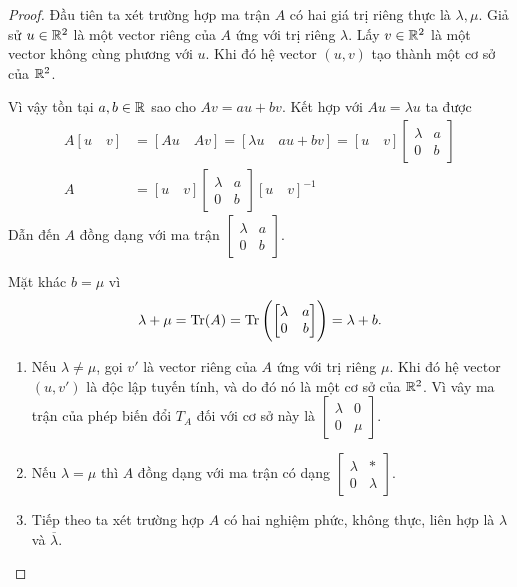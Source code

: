 \begin{proof}
    Đầu tiên ta xét trường hợp ma trận $A$ có hai giá trị riêng thực là $\lambda, \mu$. Giả sử $u \in \mathbb{R}^2$ là một vector riêng của $A$ ứng với trị riêng $\lambda$. Lấy $v \in \mathbb{R}^2$ là một vector không cùng phương với $u$. Khi đó hệ vector $(u,v)$ tạo thành một cơ sở của $\mathbb{R}^2$. 
    
    Vì vậy tồn tại $a,b \in \mathbb{R}$ sao cho $Av = au+bv$. Kết hợp với $Au = \lambda u$ ta được
    \begin{align*}
       A[u\quad v] &= [Au\quad Av]
       = [\lambda u \quad au+bv]
       = [u\quad v]\begin{bmatrix}
        \lambda &  a\\
        0 & b
    \end{bmatrix}\\
    A &= [u\quad v]\begin{bmatrix}
        \lambda &  a\\
        0 & b
    \end{bmatrix}[u \quad v]^{-1}
    \end{align*}
    Dẫn đến $A$ đồng dạng với ma trận $\begin{bmatrix}
        \lambda &  a\\
        0 & b
    \end{bmatrix}$. 
    
    Mặt khác $b = \mu$ vì
    \[\lambda + \mu = \operatorname{Tr}(A) = \operatorname{Tr}\left(\begin{bmatrix}
        \lambda &  a\\
        0 & b
    \end{bmatrix}\right) = \lambda + b.\]
    
    \begin{enumerate}
        \item Nếu $\lambda \neq \mu$, gọi $v'$ là vector riêng của $A$ ứng với trị riêng $\mu$. Khi đó hệ vector $(u,v')$ là độc lập tuyến tính, và do đó nó là một cơ sở của $\mathbb{R}^2$. Vì vây ma trận của phép biến đổi $T_A$ đối với cơ sở này là 
        $\begin{bmatrix}
        \lambda & 0\\
        0 & \mu
        \end{bmatrix}$.
        
        \item Nếu $\lambda = \mu$ thì $A$ đồng dạng với ma trận có dạng        $\begin{bmatrix}
                \lambda & *\\
                0 & \lambda
            \end{bmatrix}.$
        \item Tiếp theo ta xét trường hợp $A$ có hai nghiệm phức, không thực, liên hợp là $\lambda$ và $\overline{\lambda}$. 
        

\end{enumerate}
\end{proof}
